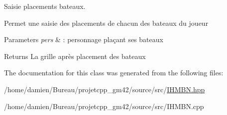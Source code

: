 Saisie placements bateaux. 

Permet une saisie des placements de chacun des bateaux du joueur 
\begin{DoxyParams}{Parameters}
{\em pers} & \-: personnage plaçant ses bateaux \\
\hline
\end{DoxyParams}
\begin{DoxyReturn}{Returns}
La grille après placement des bateaux 
\end{DoxyReturn}


The documentation for this class was generated from the following files\-:\begin{DoxyCompactItemize}
\item 
/home/damien/\-Bureau/projetcpp\-\_\-gm42/source/src/\hyperlink{IHMBN_8hpp}{I\-H\-M\-B\-N.\-hpp}\item 
/home/damien/\-Bureau/projetcpp\-\_\-gm42/source/src/I\-H\-M\-B\-N.\-cpp\end{DoxyCompactItemize}
